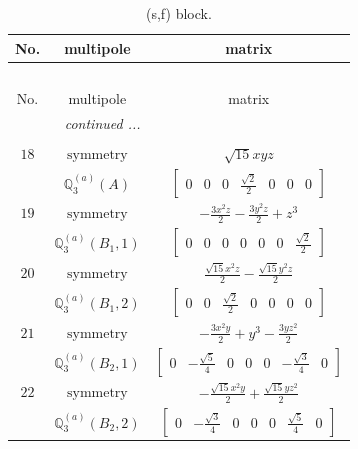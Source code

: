 \documentclass[fleqn,8pt,landscape]{jsarticle}
\begin{document}
\begin{longtable}{ccc}
\caption{(s,f) block.}
 \\
 \hline \hline
No. & multipole & matrix \\ \hline \endfirsthead

\multicolumn{2}{l}{\tablename\ \thetable{}} \\
 \hline \hline
No. & multipole & matrix \\ \hline \endhead

 \hline \hline
\multicolumn{2}{r}{\footnotesize\it continued ...} \\ \endfoot

 \hline \hline
\multicolumn{2}{r}{} \\ \endlastfoot

$ 18 $ & $ \text{symmetry} $ & $ \sqrt{15} x y z $ \\
$  $ & $ \mathbb{Q}_{3}^{(a)}(A) $ & $ \begin{bmatrix} 0 & 0 & 0 & \frac{\sqrt{2}}{2} & 0 & 0 & 0 \end{bmatrix} $ \\ \hline
$ 19 $ & $ \text{symmetry} $ & $ - \frac{3 x^{2} z}{2} - \frac{3 y^{2} z}{2} + z^{3} $ \\
$  $ & $ \mathbb{Q}_{3}^{(a)}(B_{1},1) $ & $ \begin{bmatrix} 0 & 0 & 0 & 0 & 0 & 0 & \frac{\sqrt{2}}{2} \end{bmatrix} $ \\ \hline
$ 20 $ & $ \text{symmetry} $ & $ \frac{\sqrt{15} x^{2} z}{2} - \frac{\sqrt{15} y^{2} z}{2} $ \\
$  $ & $ \mathbb{Q}_{3}^{(a)}(B_{1},2) $ & $ \begin{bmatrix} 0 & 0 & \frac{\sqrt{2}}{2} & 0 & 0 & 0 & 0 \end{bmatrix} $ \\ \hline
$ 21 $ & $ \text{symmetry} $ & $ - \frac{3 x^{2} y}{2} + y^{3} - \frac{3 y z^{2}}{2} $ \\
$  $ & $ \mathbb{Q}_{3}^{(a)}(B_{2},1) $ & $ \begin{bmatrix} 0 & - \frac{\sqrt{5}}{4} & 0 & 0 & 0 & - \frac{\sqrt{3}}{4} & 0 \end{bmatrix} $ \\ \hline
$ 22 $ & $ \text{symmetry} $ & $ - \frac{\sqrt{15} x^{2} y}{2} + \frac{\sqrt{15} y z^{2}}{2} $ \\
$  $ & $ \mathbb{Q}_{3}^{(a)}(B_{2},2) $ & $ \begin{bmatrix} 0 & - \frac{\sqrt{3}}{4} & 0 & 0 & 0 & \frac{\sqrt{5}}{4} & 0 \end{bmatrix} $ \\ \hline

\end{longtable}
\end{document}
